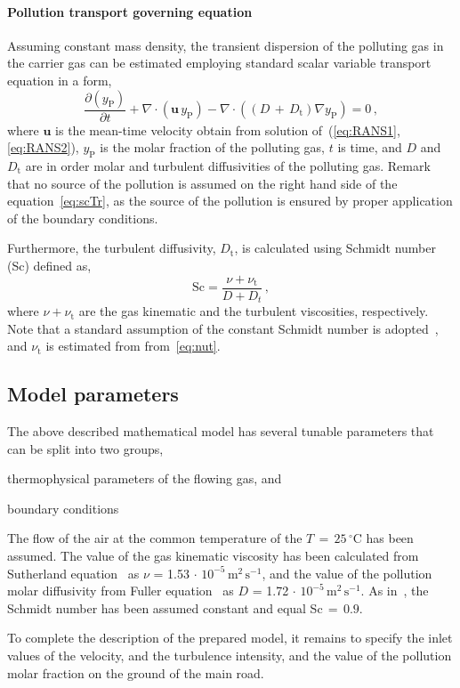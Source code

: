 \paragraph{Pollution transport governing equation} Assuming constant mass density, the transient dispersion of the polluting gas in the carrier gas can be estimated employing standard scalar variable transport equation in a form,
\begin{equation}
    \label{eq:scTr}
    \frac{\partial (y_{\mathrm{P}})}{\partial t} + \nabla\cdot(\bm{u}\, y_{\mathrm{P}}) - \nabla\cdot((D\,+\,D_{\mathrm{t}}) \nabla y_{\mathrm{P}}) = 0\,,
\end{equation}
where $\bm{u}$ is the mean-time velocity obtain from solution of~(\ref{eq:RANS1},\ref{eq:RANS2}), $y_{\mathrm{P}}$ is the molar fraction of the polluting gas, $t$ is time, and $D$ and $D_{\mathrm{t}}$ are in order molar and turbulent diffusivities of the polluting gas. Remark that no source of the pollution is assumed on the right hand side of the equation~\eqref{eq:scTr}, as the source of the pollution is ensured by proper application of the boundary conditions.

Furthermore, the turbulent diffusivity, $D_{\mathrm{t}}$, is calculated using Schmidt number (Sc) defined as, 
\begin{equation}
    \label{eq:Sc}
    \mathrm{Sc} = \frac{\nu + \nu_{\mathrm{t}}}{D + D_{t}}\,,
\end{equation}
where $\nu + \nu_{\mathrm{t}}$ are the gas kinematic and the turbulent viscosities, respectively. Note that a standard assumption of the constant Schmidt number is adopted~\cite{baik03}, and $\nu_{\mathrm{t}}$ is estimated from from~\eqref{eq:nut}.

\subsection{Model parameters}
\label{subsec:modPars}
The above described mathematical model has several tunable parameters that can be split into two groups,
\begin{inparaenum}[(i)]
    \item thermophysical parameters of the flowing gas, and
    \item boundary conditions
\end{inparaenum}

The flow of the air at the common temperature of the $T\,=\,25\,^\circ$C has been assumed. The value of the gas kinematic viscosity has been calculated from Sutherland equation~\cite{sutherland1893} as $\nu$ = 1.53$\,\cdot\, 10^{-5}\,\mathrm{m^2\,s^{-1}}$, and the value of the pollution molar diffusivity from Fuller equation~\cite{fuller66} as $D$ = 1.72$\,\cdot\, 10^{-5}\,\mathrm{m^2\,s^{-1}}$.  As in~\cite{baik03}, the Schmidt number has been assumed constant and equal Sc$\,=\,0.9$.

To complete the description of the prepared model, it remains to specify the inlet values of the velocity, and the turbulence intensity, and the value of the pollution molar fraction on the ground of the main road.